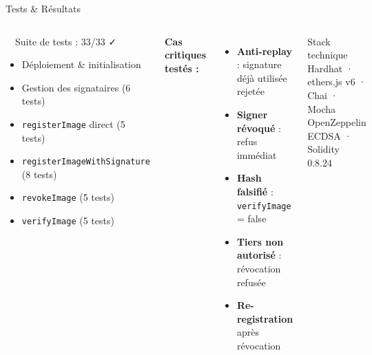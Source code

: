 \documentclass[aspectratio=169]{beamer}
\begin{document}
\begin{frame}{Tests \& Résultats}

  \begin{columns}[T]
      \begin{exampleblock}{\faCheckDouble\ \ Suite de tests : 33/33 \faCheck}
        \begin{itemize}
          \item Déploiement \& initialisation
          \item Gestion des signataires (6 tests)
          \item \texttt{registerImage} direct (5 tests)
          \item \texttt{registerImageWithSignature} (8 tests)
          \item \texttt{revokeImage} (5 tests)
          \item \texttt{verifyImage} (5 tests)
        \end{itemize}
      \end{exampleblock}

      \textbf{Cas critiques testés :}
      \begin{itemize}
        \item[\faShieldAlt] \textbf{Anti-replay} : signature déjà utilisée rejetée
        \item[\faLock] \textbf{Signer révoqué} : refus immédiat
        \item[\faExclamationTriangle] \textbf{Hash falsifié} : \texttt{verifyImage} = false
        \item[\faUserSlash] \textbf{Tiers non autorisé} : révocation refusée
        \item[\faSync] \textbf{Re-registration} après révocation
      \end{itemize}

      \vspace{0.3cm}
      \begin{block}{Stack technique}
        Hardhat · ethers.js v6 · Chai · Mocha\\
        OpenZeppelin ECDSA · Solidity 0.8.24
      \end{block}
  \end{columns}

\end{frame}
\end{document}

